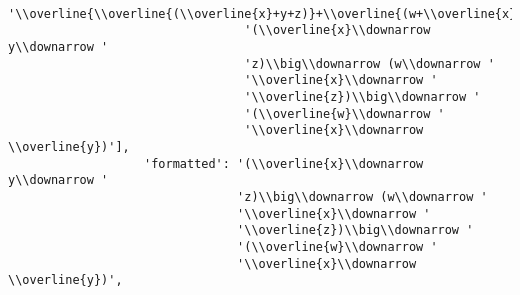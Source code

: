 \begin{verbatim}
                                 '\\overline{\\overline{(\\overline{x}+y+z)}+\\overline{(w+\\overline{x}+\\overline{z})}+\\overline{(\\overline{w}+\\overline{x}+\\overline{y})}}',
                                 '(\\overline{x}\\downarrow y\\downarrow '
                                 'z)\\big\\downarrow (w\\downarrow '
                                 '\\overline{x}\\downarrow '
                                 '\\overline{z})\\big\\downarrow '
                                 '(\\overline{w}\\downarrow '
                                 '\\overline{x}\\downarrow \\overline{y})'],
                   'formatted': '(\\overline{x}\\downarrow y\\downarrow '
                                'z)\\big\\downarrow (w\\downarrow '
                                '\\overline{x}\\downarrow '
                                '\\overline{z})\\big\\downarrow '
                                '(\\overline{w}\\downarrow '
                                '\\overline{x}\\downarrow \\overline{y})',

\end{verbatim}
